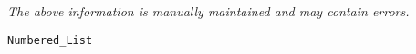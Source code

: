 \label{pkg:sequence}

{\tiny \it The above information is manually maintained and may contain errors.}
\begin{verbatim}
Numbered_List
\end{verbatim}
